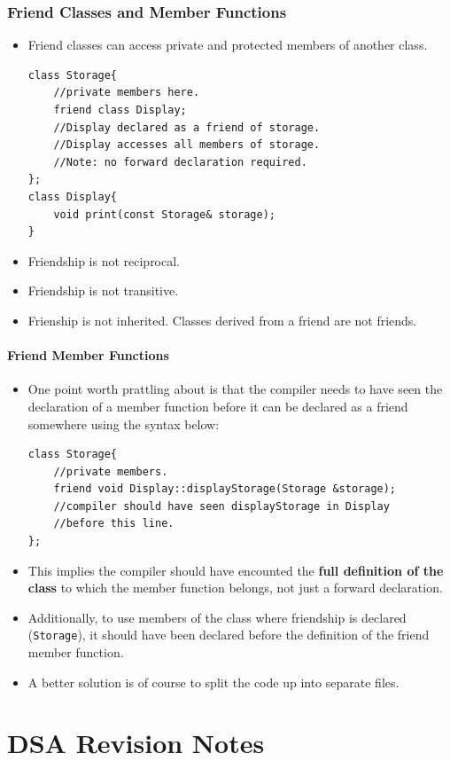 \documentclass{report}
\begin{document}
\subsection{Friend Classes and Member Functions}
\begin{itemize}
    \item Friend classes can access private and protected members of another class.
\begin{lstlisting}
class Storage{
    //private members here.
    friend class Display;
    //Display declared as a friend of storage.
    //Display accesses all members of storage.
    //Note: no forward declaration required.
};
class Display{
    void print(const Storage& storage);
}
\end{lstlisting}
\item Friendship is not reciprocal.
\item Friendship is not transitive.
\item Frienship is not inherited. Classes derived from a friend are not friends.
\end{itemize}
\subsubsection{Friend Member Functions}
\begin{itemize}
\item One point worth prattling about is that the compiler needs to have seen the declaration of a member function before it can be declared as a friend somewhere using the syntax below:
\begin{lstlisting}
class Storage{
    //private members.
    friend void Display::displayStorage(Storage &storage);
    //compiler should have seen displayStorage in Display 
    //before this line.
};
\end{lstlisting} 
\item This implies the compiler should have encounted the \textbf{full definition of the class} to which the member function belongs, not just a forward declaration.
\item Additionally, to use members of the class where friendship is declared (\texttt{Storage}), it should have been declared before the definition of the friend member function.
\item A better solution is of course to split the code up into separate files.
\end{itemize}

\chapter{DSA Revision Notes}
\end{document}
